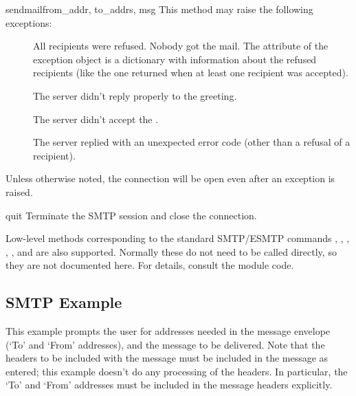 \begin{methoddesc}{sendmail}{from_addr, to_addrs, msg}
This method may raise the following exceptions:

\begin{description}
\item[]
All recipients were refused.  Nobody got the mail.  The
 attribute of the exception object is a dictionary
with information about the refused recipients (like the one returned
when at least one recipient was accepted).

\item[]
The server didn't reply properly to the  greeting.

\item[]
The server didn't accept the .

\item[]
The server replied with an unexpected error code (other than a refusal
of a recipient).
\end{description}

Unless otherwise noted, the connection will be open even after
an exception is raised.

\end{methoddesc}

\begin{methoddesc}{quit}{}
Terminate the SMTP session and close the connection.
\end{methoddesc}

Low-level methods corresponding to the standard SMTP/ESMTP commands
, , , , , and
 are also supported.  Normally these do not need to be
called directly, so they are not documented here.  For details,
consult the module code.


\subsection{SMTP Example \label{SMTP-example}}

This example prompts the user for addresses needed in the message
envelope (`To' and `From' addresses), and the message to be
delivered.  Note that the headers to be included with the message must 
be included in the message as entered; this example doesn't do any
processing of the  headers.  In particular, the `To' and
`From' addresses must be included in the message headers explicitly.

